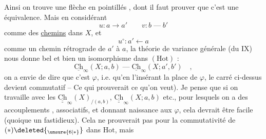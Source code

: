 Ainsi on trouve une flèche en pointillés , dont
il faut prouver que c'est une équivalence. Mais
en considérant
\[
u:a\longrightarrow a'\qquad v:b\mathbin{\text{---}}b'
\]
comme des \uline{chemins} dans $X$, et 
\[
u^\circ:a'\longleftarrow a
\]
comme un chemin rétrograde de $a'$ à $a$, la
théorie de variance générale (du IX) nous
donne bel et bien un  isomorphisme
dans $(\mathrm{Hot})$ :
\[
\underline{\mathrm{Ch}}_{\infty}(X;a,b)\mathbin{\text{---}}\underline{\mathrm{Ch}}_{\infty}(X;a',b')\quad,
\]
on a envie de dire que c'est $\varphi$, i.e. qu'en
l'insérant  la place de $\varphi$, le carré ci-dessus
devient commutatif -- Ce qui prouverait ce
qu'on veut). Je pense que si on travaille
avec les  $\underline{\underline{\mathrm{Ch}}}_{\infty}(X)_{/(a,b)}$, $\underline{\underline{\mathrm{Ch}}}_{\infty}(X;a,b)$ etc.,
pour lesquels on a des accouplements
,  associatifs,
et donnant naissance aux $\varphi$, cela devrait
être facile (quoique un  fastidieux).
Cela  ne prouverait pas pour 
la commutativité de $(*)\deleted{{}_{\unsure{6|\ast}}}$ dans $\mathrm{Hot}$, mais
